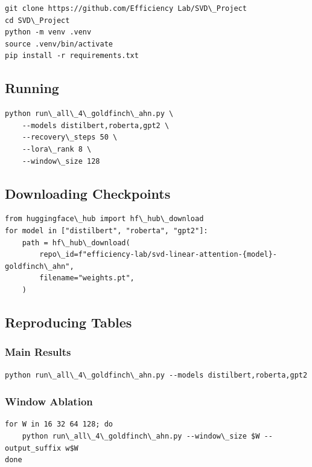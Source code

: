 \begin{lstlisting}
git clone https://github.com/Efficiency Lab/SVD\_Project
cd SVD\_Project
python -m venv .venv
source .venv/bin/activate
pip install -r requirements.txt
\end{lstlisting}

\subsection{Running}

\begin{lstlisting}
python run\_all\_4\_goldfinch\_ahn.py \
    --models distilbert,roberta,gpt2 \
    --recovery\_steps 50 \
    --lora\_rank 8 \
    --window\_size 128
\end{lstlisting}

\subsection{Downloading Checkpoints}

\begin{lstlisting}
from huggingface\_hub import hf\_hub\_download
for model in ["distilbert", "roberta", "gpt2"]:
    path = hf\_hub\_download(
        repo\_id=f"efficiency-lab/svd-linear-attention-{model}-goldfinch\_ahn",
        filename="weights.pt",
    )
\end{lstlisting}

\subsection{Reproducing Tables}

\subsubsection{Main Results}

\begin{lstlisting}
python run\_all\_4\_goldfinch\_ahn.py --models distilbert,roberta,gpt2
\end{lstlisting}

\subsubsection{Window Ablation}

\begin{lstlisting}
for W in 16 32 64 128; do
    python run\_all\_4\_goldfinch\_ahn.py --window\_size $W --output_suffix w$W
done
\end{lstlisting}

